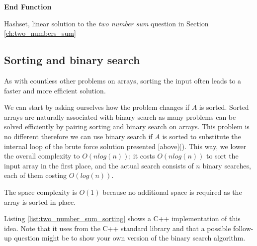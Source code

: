 \begin{algorithm}
	 
	   
	
	 \textbf{End Function}
		\caption{Hashset, linear solution to the \textit{two number sum} question in Section
		\label{algo:two_numbers_sum_hashset_wrong}
	\ref{ch:two_numbers_sum} }
\end{algorithm}


\subsection{Sorting and binary search}
\label{sect:two_number_problem_binary_search}

As with countless other problems on arrays, sorting the input often leads to a faster and more efficient solution. 

We can start by asking ourselves how the problem changes if  $A$ is sorted. Sorted arrays are naturally associated with binary search as many problems can be solved efficiently by pairing sorting and binary search on arrays. 
This problem is no different therefore we can use binary search if $A$ is sorted to substitute the internal loop of the brute force solution presented [above](). This way, we lower the overall complexity  to $O(n log(n))$; it costs
$O(n log(n))$ to sort the input array in the first place, and the actual search consists of $n$ binary
searches, each of them costing $O(log(n))$. 

The space complexity is $O(1)$ because no additional space is required as the array is sorted in place.

Listing \ref{list:two_number_sum_sorting} shows a C++ implementation of this idea. Note that it uses  from the C++ standard library and that a possible follow-up question might be to show your own version of the binary search algorithm.



